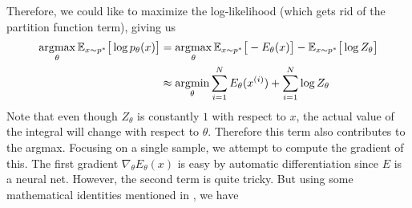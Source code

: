   Therefore, we could like to maximize the log-likelihood (which gets rid of the partition function term), giving us 
  \begin{align}
    \operatorname*{\arg\!\max}_\theta \mathbb{E}_{x \sim p^\ast} \big[ \log p_\theta (x) \big] & = \operatorname*{\arg\!\max}_\theta \mathbb{E}_{x \sim p^\ast}\big[ -E_\theta (x) \big] - \mathbb{E}_{x \sim p^\ast} \big[ \log{Z_\theta} \big] \\
                                                                            & \approx \operatorname*{\arg\!\min}_\theta \sum_{i=1}^N E_\theta (x^{(i)}) + \sum_{i=1}^N \log Z_\theta
  \end{align} 
  Note that even though $Z_\theta$ is constantly $1$ with respect to $x$, the actual value of the integral will change with respect to $\theta$. Therefore this term also contributes to the argmax. Focusing on a single sample, we attempt to compute the gradient of this. The first gradient $\nabla_\theta E_\theta (x)$ is easy by automatic differentiation since $E$ is a neural net. However, the second term is quite tricky. But using some mathematical identities mentioned in \cite{ebm_train}, we have 

